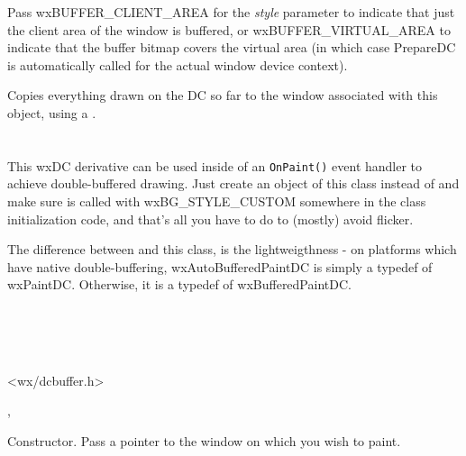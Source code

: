 Pass wxBUFFER\_CLIENT\_AREA for the {\it style} parameter to indicate that just the client area of
the window is buffered, or wxBUFFER\_VIRTUAL\_AREA to indicate that the buffer bitmap
covers the virtual area (in which case PrepareDC is automatically called for the actual window
device context).

\label{wxbufferedpaintdcdtor}

Copies everything drawn on the DC so far to the window associated with this
object, using a .



\section{}\label{wxautobufferedpaintdc}

This wxDC derivative can be used inside of an \texttt{OnPaint()} event handler to achieve
double-buffered drawing. Just create an object of this class instead of 
and make sure  is called
with wxBG\_STYLE\_CUSTOM somewhere in the class initialization code, and that's all you have
to do to (mostly) avoid flicker.

The difference between  and this class,
is the lightweigthness - on platforms which have native double-buffering, wxAutoBufferedPaintDC is simply
a typedef of wxPaintDC. Otherwise, it is a typedef of wxBufferedPaintDC.



\\
\\
\\


<wx/dcbuffer.h>


,\rtfsp
{}



\label{wxautobufferedpaintdcctor}


Constructor. Pass a pointer to the window on which you wish to paint.

